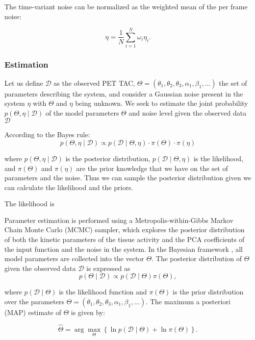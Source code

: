 The time-variant noise can be normalized as the weighted mean of the per frame noise:

\[
	\eta= \frac{1}{N} \sum_{i=1}^{N} \omega_i \eta_{i}.
\]

\subsubsection{Estimation}
Let us define  \(\mathcal{D}\) as the observed PET TAC, \( \Theta = (\theta_{1}, \theta_{2}, \theta_{3}, \alpha_{1}, \beta_{1}, \dots) \) the set of parameters describing the system, and consider a Gaussian noise present in the system \(\eta\) with \(\Theta\) and \(\eta\) being unknown. We seek to estimate the joint probability \(p(\Theta,\eta \mid \mathcal{D})\) of the model parameters \(\Theta\) and noise level given the observed data \(\mathcal{D}\)

According to the Bayes rule:
\[
	p(\Theta,\eta \mid \mathcal{D}) \propto p(\mathcal{D} \mid \Theta,\eta) \cdot \pi( \Theta ) \cdot \pi( \eta )
\]

where  \(p(\Theta,\eta \mid \mathcal{D})\) is the posterior distribution, \(p(\mathcal{D} \mid \Theta,\eta)\) is the likelihood, and $\pi(\Theta)$ and $\pi(\eta)$ are the prior knowledge that we have on the set of parameters and the noise. Thus we can sample the posterior distribution given we can calculate the likelihood and the priors.

The likelihood is


Parameter estimation is performed using a Metropolis-within-Gibbs Markov Chain Monte Carlo (MCMC) sampler, which explores the posterior distribution of both the kinetic parameters of the tissue activity and the PCA coefficients of the input function and the noise in the system.
In the Bayesian framework \cite{irace2021bayesian}, all model parameters are collected into the vector $\Theta$. The posterior distribution of $\Theta$ given the observed data $\mathcal{D}$ is expressed as
\begin{equation}
	p(\Theta \mid \mathcal{D}) \propto p(\mathcal{D} \mid \Theta) \pi(\Theta),
\end{equation}

where \( p(\mathcal{D} \mid \Theta) \) is the likelihood function and \( \pi(\Theta) \) is the prior distribution over the parameters \( \Theta = (\theta_{1}, \theta_{2}, \theta_{3}, \alpha_{1}, \beta_{1}, \dots) \). The maximum a posteriori (MAP) estimate of \( \Theta \) is given by:

\begin{equation}
	\hat{\Theta}
	=
	\arg\max_{\Theta}
	\left\{
	\ln p(\mathcal{D} \mid \Theta)
	+
	\ln \pi(\Theta)
	\right\}.
\end{equation}

